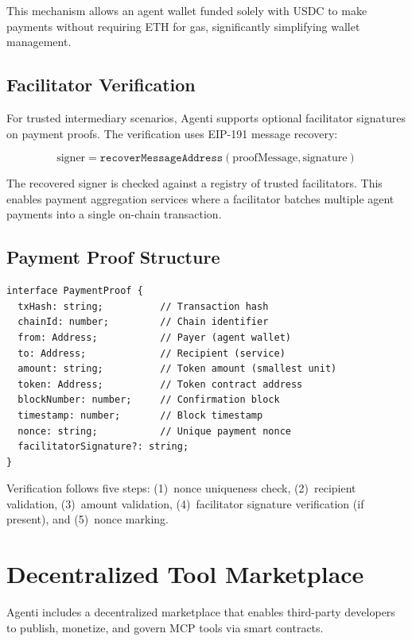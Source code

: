 \documentclass[11pt]{article}
\begin{document}
This mechanism allows an agent wallet funded solely with USDC to make payments without requiring ETH for gas, significantly simplifying wallet management.

\subsection{Facilitator Verification}

For trusted intermediary scenarios, Agenti supports optional facilitator signatures on payment proofs. The verification uses EIP-191 message recovery:

$$\text{signer} = \texttt{recoverMessageAddress}(\text{proofMessage}, \text{signature})$$

The recovered signer is checked against a registry of trusted facilitators. This enables payment aggregation services where a facilitator batches multiple agent payments into a single on-chain transaction.

\subsection{Payment Proof Structure}

\begin{lstlisting}[caption={Payment proof data structure.},label={lst:proof}]
interface PaymentProof {
  txHash: string;          // Transaction hash
  chainId: number;         // Chain identifier
  from: Address;           // Payer (agent wallet)
  to: Address;             // Recipient (service)
  amount: string;          // Token amount (smallest unit)
  token: Address;          // Token contract address
  blockNumber: number;     // Confirmation block
  timestamp: number;       // Block timestamp
  nonce: string;           // Unique payment nonce
  facilitatorSignature?: string;
}
\end{lstlisting}

Verification follows five steps: (1)~nonce uniqueness check, (2)~recipient validation, (3)~amount validation, (4)~facilitator signature verification (if present), and (5)~nonce marking.

\section{Decentralized Tool Marketplace}
\label{sec:marketplace}

Agenti includes a decentralized marketplace that enables third-party developers to publish, monetize, and govern MCP tools via smart contracts.
\end{document}
